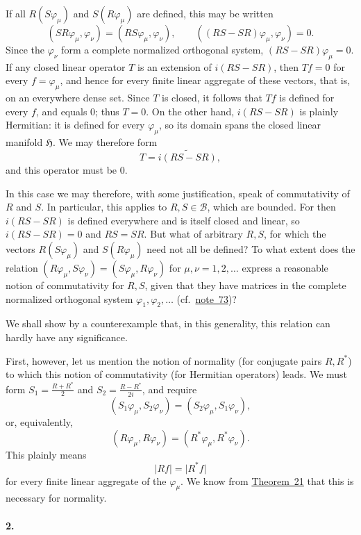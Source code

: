 \documentclass[
  paper=b5,
  twoside=true,
  fontsize=13pt,
  headings=normal,
  bookmarkpackage=false
]{scrartcl}
\theoremstyle{definition}
\newcommand{\NoteRef}[1]{\hyperref[fn:#1]{note~#1}}
\newcommand{\TheoremRef}[1]{\hyperref[thm:#1]{Theorem~#1}}
\begin{document}
If all \(R(S\varphi_{\mu})\) and \(S(R\varphi_{\mu})\) are defined, this
may be written
\[
  (SR\varphi_{\mu},\varphi_{\nu})
  =
  (RS\varphi_{\mu},\varphi_{\nu}),
  \qquad
  ((RS-SR)\varphi_{\mu},\varphi_{\nu})=0.
\]
Since the \(\varphi_{\nu}\) form a complete normalized orthogonal
system, \((RS-SR)\varphi_{\mu}=0\).  If any closed linear operator \(T\)
is an extension of \(i(RS-SR)\), then \(Tf=0\) for every
\(f=\varphi_{\mu}\), and hence for every finite linear aggregate of these
vectors, that is, on an everywhere dense set.  Since \(T\) is closed, it
follows that \(Tf\) is defined for every \(f\), and equals \(0\); thus
\(T=0\).  On the other hand, \(i(RS-SR)\) is plainly Hermitian: it is
defined for every \(\varphi_{\mu}\), so its domain spans the closed linear
manifold \(\mathfrak H\).  We may therefore form
\[
  T=\widetilde{i(RS-SR)},
\]
and this operator must be \(0\).

In this case we may therefore, with some justification, speak of
commutativity of \(R\) and \(S\).  In particular, this applies to
\(R,S\in\mathcal B\), which are bounded.  For then \(i(RS-SR)\) is
defined everywhere and is itself closed and linear, so \(i(RS-SR)=0\) and \(RS=SR\). But what of arbitrary \(R,S\), for
which the vectors \(R(S\varphi_{\mu})\) and \(S(R\varphi_{\mu})\) need
not all be defined? To what extent does the relation
\((R\varphi_{\mu},S\varphi_{\nu})=(S\varphi_{\mu},R\varphi_{\nu})\)
for \(\mu,\nu=1,2,\ldots\) express a reasonable notion of commutativity
for \(R,S\), given that they have matrices in the complete normalized
orthogonal system \(\varphi_{1},\varphi_{2},\ldots\)
(cf.\ \NoteRef{73})?

We shall show by a counterexample that, in this generality, this relation can hardly have any significance.

First, however, let us mention the notion of normality (for conjugate
pairs \(R,R^{*}\)) to which this notion of commutativity (for Hermitian
operators) leads.  We must form \(S_{1}=\frac{R+R^{*}}{2}\) and
\(S_{2}=\frac{R-R^{*}}{2i}\), and require
\[
  (S_{1}\varphi_{\mu},S_{2}\varphi_{\nu})
  =
  (S_{2}\varphi_{\mu},S_{1}\varphi_{\nu}),
\]
or, equivalently,
\[
  (R\varphi_{\mu},R\varphi_{\nu})
  =
  (R^{*}\varphi_{\mu},R^{*}\varphi_{\nu}).
\]
This plainly means
\[
  \lvert Rf\rvert=\lvert R^{*}f\rvert
\]
for every finite linear aggregate of the \(\varphi_{\mu}\).  We know from
\TheoremRef{21} that this is necessary for normality.

\paragraph*{2.}
\label{app:III-2}
\end{document}
